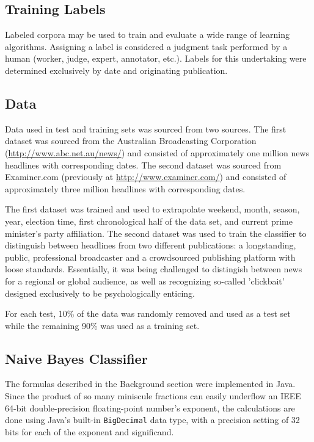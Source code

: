 \documentclass[format=acmlarge]{acmart}
\begin{document}
\subsection{Training Labels}
Labeled corpora may be used to train and evaluate a wide range of learning algorithms. Assigning a label is considered a judgment task performed by a human (worker, judge, expert, annotator, etc.).  Labels for this undertaking were determined exclusively by date and originating publication.

\subsection{Data}
Data used in test and training sets was sourced from two sources.  The first dataset was sourced from the Australian Broadcasting Corporation (\url{http://www.abc.net.au/news/}) and consisted of approximately one million news headlines with corresponding dates.  The second dataset was sourced from Examiner.com (previously at \url{http://www.examiner.com/}) and consisted of approximately three million headlines with corresponding dates.

The first dataset was trained and used to extrapolate weekend, month, season, year, election time, first chronological half of the data set, and current prime minister's party affiliation.  The second dataset was used to train the classifier to distinguish between headlines from two different publications:  a longstanding, public, professional broadcaster and a crowdsourced publishing platform with loose standards.  Essentially, it was being challenged to distingish between news for a regional or global audience, as well as recognizing so-called 'clickbait' designed exclusively to be psychologically enticing.

For each test, 10\% of the data was randomly removed and used as a test set while the remaining 90\% was used as a training set.

\subsection{Naive Bayes Classifier}
The formulas described in the Background section were implemented in Java.  Since the product of so many miniscule fractions can easily underflow an IEEE 64-bit double-precision floating-point number's exponent, the calculations are done using Java's built-in \texttt{BigDecimal} data type, with a precision setting of 32 bits for each of the exponent and significand.
\end{document}
